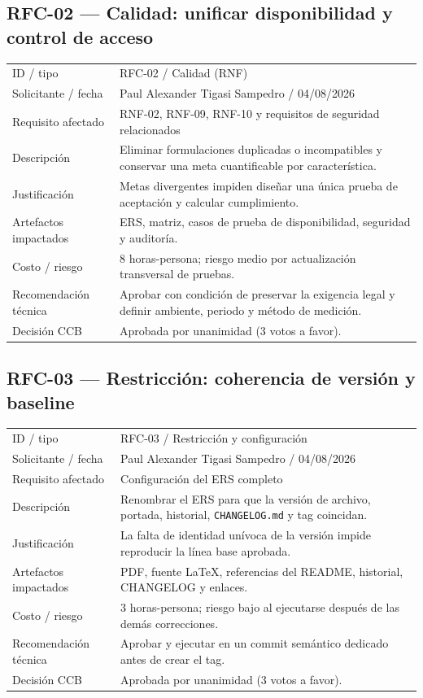 \documentclass[11pt,a4paper]{article}
\begin{document}
	\subsection{RFC-02 --- Calidad: unificar disponibilidad y control de acceso}
	\begin{tabularx}{\textwidth}{p{4.2cm}X}
		\toprule
		ID / tipo & RFC-02 / Calidad (RNF)\\
		Solicitante / fecha & Paul Alexander Tigasi Sampedro / 04/08/2026\\
		Requisito afectado & RNF-02, RNF-09, RNF-10 y requisitos de seguridad relacionados\\
		Descripción & Eliminar formulaciones duplicadas o incompatibles y conservar una meta cuantificable por característica.\\
		Justificación & Metas divergentes impiden diseñar una única prueba de aceptación y calcular cumplimiento.\\
		Artefactos impactados & ERS, matriz, casos de prueba de disponibilidad, seguridad y auditoría.\\
		Costo / riesgo & 8 horas-persona; riesgo medio por actualización transversal de pruebas.\\
		Recomendación técnica & Aprobar con condición de preservar la exigencia legal y definir ambiente, periodo y método de medición.\\
		Decisión CCB & Aprobada por unanimidad (3 votos a favor).\\
		\bottomrule
	\end{tabularx}
	
	\subsection{RFC-03 --- Restricción: coherencia de versión y baseline}
	\begin{tabularx}{\textwidth}{p{4.2cm}X}
		\toprule
		ID / tipo & RFC-03 / Restricción y configuración\\
		Solicitante / fecha & Paul Alexander Tigasi Sampedro / 04/08/2026\\
		Requisito afectado & Configuración del ERS completo\\
		Descripción & Renombrar el ERS para que la versión de archivo, portada, historial, \texttt{CHANGELOG.md} y tag coincidan.\\
		Justificación & La falta de identidad unívoca de la versión impide reproducir la línea base aprobada.\\
		Artefactos impactados & PDF, fuente \LaTeX, referencias del README, historial, CHANGELOG y enlaces.\\
		Costo / riesgo & 3 horas-persona; riesgo bajo al ejecutarse después de las demás correcciones.\\
		Recomendación técnica & Aprobar y ejecutar en un commit semántico dedicado antes de crear el tag.\\
		Decisión CCB & Aprobada por unanimidad (3 votos a favor).\\
		\bottomrule
	\end{tabularx}
	
\end{document}
